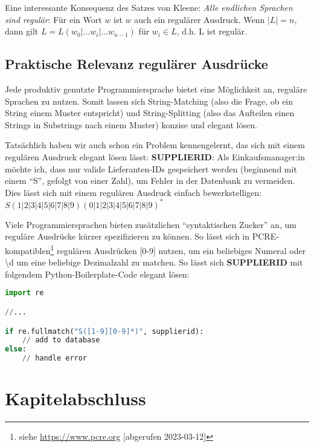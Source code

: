 Eine interessante Konsequenz des Satzes von Kleene:
\emph{Alle endlichen Sprachen sind regulär}:
Für ein Wort $w$ ist $w$ auch ein regulärer Ausdruck.
Wenn $|L| = n$, dann gilt $L = L(w_0|\dots{}w_i|\dots{}w_{n-1})$ für $w_i \in L$, d.h. L ist regulär.


\subsection{Praktische Relevanz regulärer Ausdrücke}

Jede produktiv genutzte Programmiersprache bietet eine Möglichkeit an,
reguläre Sprachen zu nutzen.
Somit lassen sich String-Matching (also die Frage, ob ein String einem Muster entspricht)
und String-Splitting (also das Aufteilen einen Strings in Substrings nach einem Muster)
konzise und elegant lösen.

Tatsächlich haben wir auch schon ein Problem kennengelernt,
das sich mit einem regulären Ausdruck elegant lösen lässt: \textbf{SUPPLIERID}:
Als Einkaufsmanager:in möchte ich,
        dass nur valide Lieferanten-IDs gespeichert werden
        (beginnend mit einem ``S'', gefolgt von einer Zahl),
        um Fehler in der Datenbank zu vermeiden.
Dies lässt sich mit einem regulären Ausdruck einfach bewerkstelligen:
$S(1|2|3|4|5|6|7|8|9)(0|1|2|3|4|5|6|7|8|9)^*$

Viele Programmiersprachen bieten zusätzlichen ``syntaktischen Zucker'' an,
um reguläre Ausdrücke kürzer spezifizieren zu können.
So lässt sich in PCRE-kompatiblen\footnote{
    siehe \href{https://www.pcre.org/}{https://www.pcre.org} [abgerufen 2023-03-12]}
regulären Ausdrücken [0-9] nutzen, um ein beliebiges Numeral 
oder \textbackslash{}d um eine beliebige Dezimalzahl zu matchen.
So lässt sich \textbf{SUPPLIERID} mit folgendem Python-Boilerplate-Code elegant lösen:

\begin{lstlisting}[language=Python, caption=Python-Boilerplate für \textbf{SUPPLIERID}]
import re

//...

if re.fullmatch("S([1-9][0-9]*)", supplierid):
    // add to database
else:
    // handle error
\end{lstlisting}

\section*{Kapitelabschluss}
